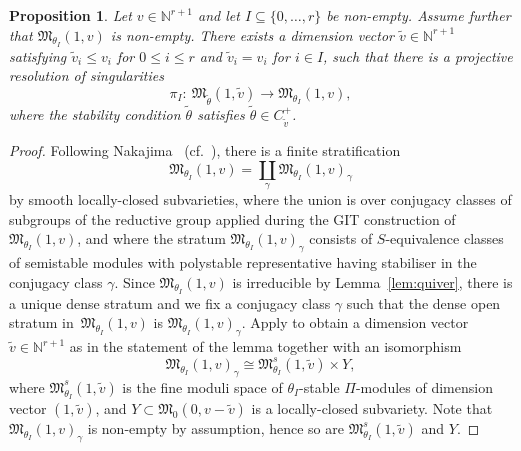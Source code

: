 \documentclass[10pt,a4paper]{amsart}
\newtheorem{Proposition}[Theorem]{Proposition}
 { \theoremstyle{definition}
\newtheorem{Definition}[Theorem]{Definition}
\newtheorem{Example}[Theorem]{Example}
\newtheorem{Remark}[Theorem]{Remark}
\newtheorem{remarks}[theorem]{Remarks}
}
\numberwithin{equation}{section}
\begin{document}
\begin{Proposition}\label{prop:surjvar}
Let $v \in \mathbb{N}^{r+1}$ and let $ I \subseteq \{0, \dots , r\}$ be non-empty. Assume further that
$\mathfrak{M}_{\theta_I}(1,v)$ is non-empty.
There exists a dimension vector $\widetilde{v}\in \mathbb{N}^{r+1}$ satisfying $\widetilde{v}_i \leq v_i$ for $0 \leq i \leq r$ and $\widetilde{v}_i = v_i$ for $i \in I$,
such that there is a projective resolution of singularities
\[
\pi_{I}\colon \ \mathfrak{M}_{\widetilde{\theta}}(1,\widetilde{v})\to \mathfrak{M}_{\theta_I}(1,v),
\]
where the stability condition $\widetilde{\theta}$ satisfies $\widetilde\theta\in C_{\widetilde v}^+$.
\end{Proposition}
\begin{proof}
 Following Nakajima~\cite[Section 6]{nakajima1994instantons} (cf.\ \cite[Section 3.5]{bellamy2020birational}),
 there is a finite stratification
\begin{equation*}
\mathfrak{M}_{\theta_I}(1,v) = \coprod_{\gamma} \mathfrak{M}_{\theta_I}(1,v)_{\gamma} \end{equation*}
by smooth locally-closed subvarieties, where the union is over conjugacy classes of subgroups of the reductive group applied during the GIT construction of $\mathfrak{M}_{\theta_I}(1,v)$, and where the stratum $\mathfrak{M}_{\theta_I}(1,v)_{\gamma}$ consists of $S$-equivalence classes of semistable modules with polystable representative having stabiliser in the conjugacy class $\gamma$. Since $\mathfrak{M}_{\theta_I}(1,v)$ is irreducible by Lemma~\ref{lem:quiver}, there is a unique dense stratum and we fix a conjugacy class $\gamma$
 such that the dense open stratum in~$\mathfrak{M}_{\theta_I}(1,v)$ is $\mathfrak{M}_{\theta_I}(1,v)_\gamma$. Apply \cite[Proposition 2.25]{nakajima2009quiver} to obtain a dimension vector $\widetilde{v}\in \mathbb{N}^{r+1}$ as in the statement of the lemma
 together with an isomorphism
\begin{equation} \label{eqn:gammaIsom}
\mathfrak{M}_{\theta_I}(1,v)_{\gamma} \cong \mathfrak{M}^s_{\theta_I}(1,\widetilde{v}) \times {Y},
\end{equation}
 where $\mathfrak{M}^s_{\theta_I}(1,\widetilde{v})$ is the fine moduli space of $\theta_I$-stable $\Pi$-modules of dimension vector $(1,\widetilde{v})$, and ${Y} \subset \mathfrak{M}_{0}(0,v-\widetilde{v})$ is a locally-closed subvariety.
 Note that $\mathfrak{M}_{\theta_I}(1,v)_{\gamma}$ is non-empty by assumption, hence so are $\mathfrak{M}^s_{\theta_I}(1,\widetilde{v})$ and ${Y}$.


\end{proof}
\end{document}

